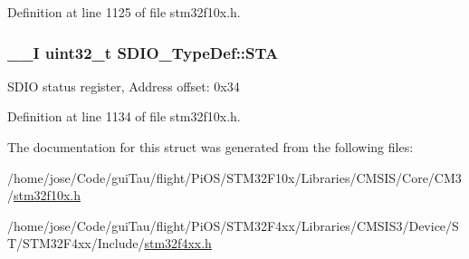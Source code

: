 Definition at line 1125 of file stm32f10x.\-h.

\hypertarget{struct_s_d_i_o___type_def_a6b917b09c127e77bd3128bbe19a00499}{
\subsubsection[{S\-T\-A}]{\setlength{\rightskip}{0pt plus 5cm}\-\_\-\-\_\-\-I {\bf uint32\-\_\-t} S\-D\-I\-O\-\_\-\-Type\-Def\-::\-S\-T\-A}}\label{struct_s_d_i_o___type_def_a6b917b09c127e77bd3128bbe19a00499}
S\-D\-I\-O status register, Address offset\-: 0x34 

Definition at line 1134 of file stm32f10x.\-h.



The documentation for this struct was generated from the following files\-:\begin{DoxyCompactItemize}
\item 
/home/jose/\-Code/gui\-Tau/flight/\-Pi\-O\-S/\-S\-T\-M32\-F10x/\-Libraries/\-C\-M\-S\-I\-S/\-Core/\-C\-M3/\hyperlink{stm32f10x_8h}{stm32f10x.\-h}\item 
/home/jose/\-Code/gui\-Tau/flight/\-Pi\-O\-S/\-S\-T\-M32\-F4xx/\-Libraries/\-C\-M\-S\-I\-S3/\-Device/\-S\-T/\-S\-T\-M32\-F4xx/\-Include/\hyperlink{stm32f4xx_8h}{stm32f4xx.\-h}\end{DoxyCompactItemize}

